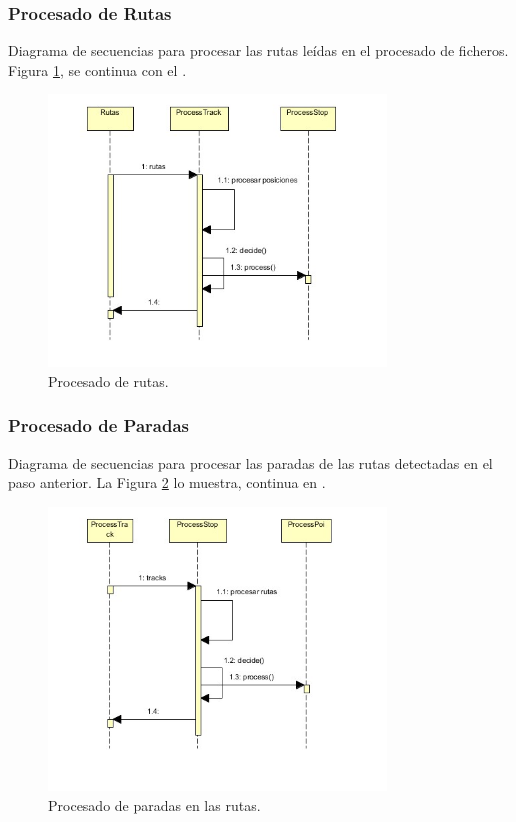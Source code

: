 \subsubsection{Procesado de Rutas}
Diagrama de secuencias para procesar las rutas leídas en el procesado de ficheros. Figura \ref{procesado}, se continua con el .
\begin{figure}[!htbp]
  \centering
    \includegraphics[width=0.8\textwidth]{../img/diagramas/secuencias/8.jpg}
  \caption{Procesado de rutas.}
  \label{procesado}
\end{figure}

\subsubsection{Procesado de Paradas}
Diagrama de secuencias para procesar las paradas de las rutas detectadas en el paso anterior. La Figura \ref{paradas} lo muestra, continua en .
\begin{figure}[!htbp]
  \centering
    \includegraphics[width=0.8\textwidth]{../img/diagramas/secuencias/9.jpg}
  \caption{Procesado de paradas en las rutas.}
  \label{paradas}
\end{figure}

